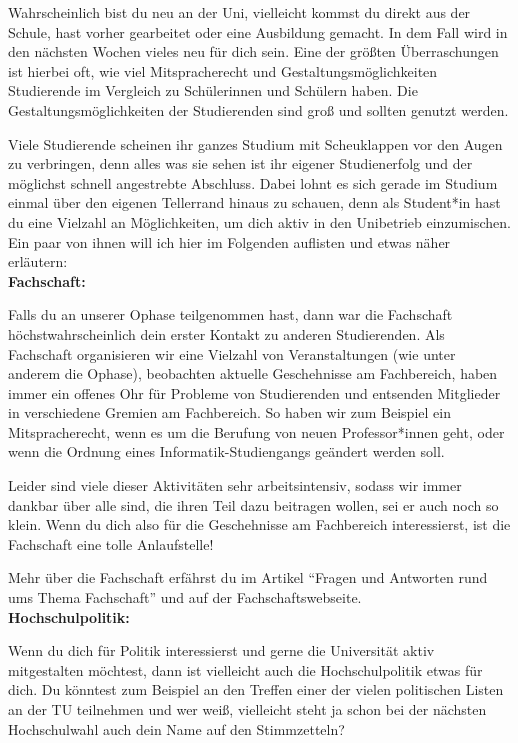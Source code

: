 {Wahrscheinlich bist du neu an der Uni, vielleicht kommst du direkt aus der Schule, hast vorher gearbeitet oder eine Ausbildung gemacht. In dem Fall wird in den nächsten Wochen vieles neu für dich sein. Eine der größten Überraschungen ist hierbei oft, wie viel Mitspracherecht und Gestaltungsmöglichkeiten Studierende im Vergleich zu Schülerinnen und Schülern haben. Die Gestaltungsmöglichkeiten der Studierenden sind groß und sollten genutzt werden.
}{
Viele Studierende scheinen ihr ganzes Studium mit Scheuklappen vor den Augen zu verbringen, denn alles was sie sehen ist ihr eigener Studienerfolg und der möglichst schnell angestrebte Abschluss. Dabei lohnt es sich gerade im Studium einmal über den eigenen Tellerrand hinaus zu schauen, denn als Student*in hast du eine Vielzahl an Möglichkeiten, um dich aktiv in den Unibetrieb einzumischen. Ein paar von ihnen will ich hier im Folgenden auflisten und etwas näher erläutern:\\

\textbf{Fachschaft:}

Falls du an unserer Ophase teilgenommen hast, dann war die Fachschaft höchstwahrscheinlich dein erster Kontakt zu anderen Studierenden. Als Fachschaft organisieren wir eine Vielzahl von Veranstaltungen (wie unter anderem die Ophase),  beobachten aktuelle Geschehnisse am Fachbereich, haben immer ein offenes Ohr für Probleme von Studierenden und entsenden Mitglieder in verschiedene Gremien am Fachbereich. So haben wir zum Beispiel ein Mitspracherecht, wenn es um die Berufung von neuen Professor*innen geht, oder wenn die Ordnung eines Informatik-Studiengangs geändert werden soll.

Leider sind viele dieser Aktivitäten sehr arbeitsintensiv, sodass wir immer dankbar über alle sind, die ihren Teil dazu beitragen wollen, sei er auch noch so klein. Wenn du dich also für die Geschehnisse am Fachbereich interessierst, ist die Fachschaft eine tolle Anlaufstelle!

Mehr über die Fachschaft erfährst du im Artikel "`Fragen und Antworten rund ums Thema Fachschaft"' und auf der Fachschaftswebseite\footnotemark[1].\\

\textbf{Hochschulpolitik:}

Wenn du dich für Politik interessierst und gerne die Universität aktiv mitgestalten möchtest, dann ist vielleicht auch die Hochschulpolitik etwas für dich. Du könntest zum Beispiel an den Treffen einer der vielen politischen Listen an der TU teilnehmen und wer weiß, vielleicht steht ja schon bei der nächsten Hochschulwahl auch dein Name auf den Stimmzetteln?

}
